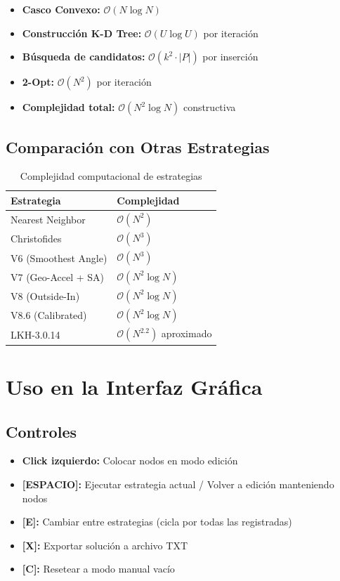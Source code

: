 \documentclass[12pt, a4paper]{article}
\begin{document}
\begin{itemize}
    \item \textbf{Casco Convexo:} $\mathcal{O}(N \log N)$
    \item \textbf{Construcción K-D Tree:} $\mathcal{O}(U \log U)$ por iteración
    \item \textbf{Búsqueda de candidatos:} $\mathcal{O}(k^2 \cdot |P|)$ por inserción
    \item \textbf{2-Opt:} $\mathcal{O}(N^2)$ por iteración
    \item \textbf{Complejidad total:} $\mathcal{O}(N^2 \log N)$ constructiva
\end{itemize}

\subsection{Comparación con Otras Estrategias}

\begin{table}[h]
\centering
\begin{tabular}{ll}
\toprule
\textbf{Estrategia} & \textbf{Complejidad} \\
\midrule
Nearest Neighbor & $\mathcal{O}(N^2)$ \\
Christofides & $\mathcal{O}(N^3)$ \\
V6 (Smoothest Angle) & $\mathcal{O}(N^3)$ \\
V7 (Geo-Accel + SA) & $\mathcal{O}(N^2 \log N)$ \\
V8 (Outside-In) & $\mathcal{O}(N^2 \log N)$ \\
V8.6 (Calibrated) & $\mathcal{O}(N^2 \log N)$ \\
LKH-3.0.14 & $\mathcal{O}(N^{2.2})$ aproximado \\
\bottomrule
\end{tabular}
\caption{Complejidad computacional de estrategias}
\label{tab:complexity}
\end{table}

\section{Uso en la Interfaz Gráfica}

\subsection{Controles}

\begin{itemize}
    \item \textbf{Click izquierdo:} Colocar nodos en modo edición
    \item \textbf{[ESPACIO]:} Ejecutar estrategia actual / Volver a edición manteniendo nodos
    \item \textbf{[E]:} Cambiar entre estrategias (cicla por todas las registradas)
    \item \textbf{[X]:} Exportar solución a archivo TXT
    \item \textbf{[C]:} Resetear a modo manual vacío
\end{itemize}
\end{document}
